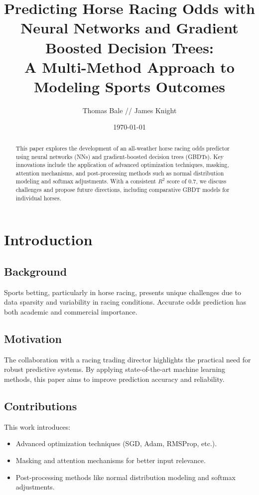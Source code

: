 \documentclass[twocolumn]{article}
\title{Predicting Horse Racing Odds with Neural Networks and Gradient Boosted Decision Trees: \\ A Multi-Method Approach to Modeling Sports Outcomes}
\author{Thomas Bale // James Knight}
\date{\today}
\begin{document}
\maketitle

\begin{abstract}
This paper explores the development of an all-weather horse racing odds predictor using neural networks (NNs) and gradient-boosted decision trees (GBDTs). Key innovations include the application of advanced optimization techniques, masking, attention mechanisms, and post-processing methods such as normal distribution modeling and softmax adjustments. With a consistent \(R^2\) score of 0.7, we discuss challenges and propose future directions, including comparative GBDT models for individual horses.
\end{abstract}

\section{Introduction}
\subsection{Background}
Sports betting, particularly in horse racing, presents unique challenges due to data sparsity and variability in racing conditions. Accurate odds prediction has both academic and commercial importance.

\subsection{Motivation}
The collaboration with a racing trading director highlights the practical need for robust predictive systems. By applying state-of-the-art machine learning methods, this paper aims to improve prediction accuracy and reliability.

\subsection{Contributions}
This work introduces:
\begin{itemize}
    \item Advanced optimization techniques (SGD, Adam, RMSProp, etc.).
    \item Masking and attention mechanisms for better input relevance.
    \item Post-processing methods like normal distribution modeling and softmax adjustments.
\end{itemize}
\end{document}
